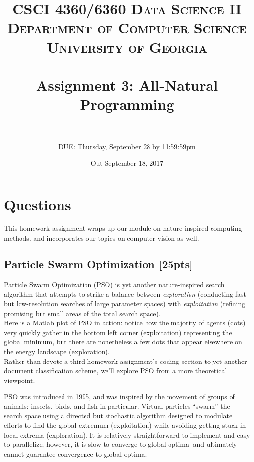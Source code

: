 \documentclass[paper=a4, fontsize=11pt]{scrartcl} %
\title{	
\normalfont \normalsize 
\textsc{CSCI 4360/6360 Data Science II} \\
\textsc{Department of Computer Science} \\
\textsc{University of Georgia} \\ [15pt] %
\horrule{0.5pt} \\[0.3cm] %
\huge Assignment 3: All-Natural Programming \\ %
\horrule{2pt} \\[0.4cm] %
}
\author{DUE: Thursday, September 28 by 11:59:59pm} %
\date{\normalsize Out September 18, 2017}
\numberwithin{figure}{section} %
\numberwithin{table}{section} %
\begin{document}
\maketitle %


\section*{Questions}

This homework assignment wraps up our module on nature-inspired computing methods, and incorporates our topics on computer vision as well.

\setcounter{subsection}{0}

\subsection{Particle Swarm Optimization \textbf{[25pts]}}

Particle Swarm Optimization (PSO) is yet another nature-inspired search algorithm that attempts to strike a balance between \emph{exploration} (conducting fast but low-resolution searches of large parameter spaces) with \emph{exploitation} (refining promising but small areas of the total search space). \\

\href{https://www.youtube.com/watch?v=lX5qJimYusQ}{Here is a Matlab plot of PSO in action}: notice how the majority of agents (dots) very quickly gather in the bottom left corner (exploitation) representing the global minimum, but there are nonetheless a few dots that appear elsewhere on the energy landscape (exploration). \\

Rather than devote a third homework assignment's coding section to yet another document classification scheme, we'll explore PSO from a more theoretical viewpoint. 

PSO was introduced in 1995, and was inspired by the movement of groups of animals: insects, birds, and fish in particular. Virtual particles ``swarm'' the search space using a directed but stochastic algorithm designed to modulate efforts to find the global extremum (exploitation) while avoiding getting stuck in local extrema (exploration). It is relatively straightforward to implement and easy to parallelize; however, it is slow to converge to global optima, and ultimately cannot guarantee convergence to global optima. \\
\end{document}
